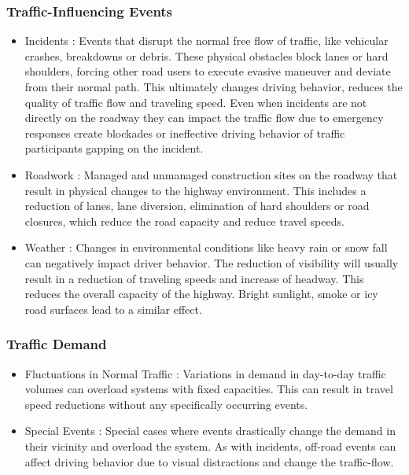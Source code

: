 \subsubsection{Traffic-Influencing Events}

\begin{itemize}
	\item Incidents : Events that disrupt the normal free flow of traffic, like vehicular crashes, breakdowns or debris. These physical obstacles block lanes or hard shoulders, forcing other road users to execute evasive maneuver and deviate from their normal path. This ultimately changes driving behavior, reduces the quality of traffic flow and traveling speed. Even when incidents are not directly on the roadway they can impact the traffic flow due to emergency responses create blockades or ineffective driving behavior of traffic participants gapping on the incident.
	\item Roadwork : Managed and unmanaged construction sites on the roadway that result in physical changes to the highway environment. This includes a reduction of lanes, lane diversion, elimination of hard shoulders or road closures, which reduce the road capacity and reduce travel speeds.
	\item Weather : Changes in environmental conditions like heavy rain or snow fall can negatively impact driver behavior. The reduction of visibility will usually result in a reduction of traveling speeds and increase of headway. This reduces the overall capacity of the highway. Bright sunlight, smoke or icy road surfaces lead to a similar effect.
\end{itemize}

\subsubsection{Traffic Demand}

\begin{itemize}
	\item Fluctuations in Normal Traffic : Variations in demand in day-to-day traffic volumes can overload systems with fixed capacities. This can result in travel speed reductions without any specifically occurring events.
	\item Special Events : Special cases where events drastically change the demand in their vicinity and overload the system. As with incidents, off-road events can affect driving behavior due to visual distractions and change the traffic-flow. 
\end{itemize}

